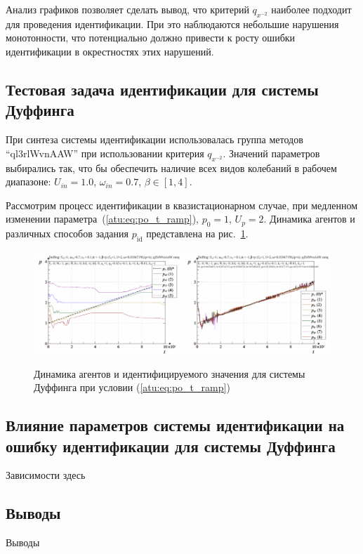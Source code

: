 Анализ графиков позволяет сделать вывод, что критерий $q_{x^{-2}}$
наиболее подходит для проведения идентификации. При это наблюдаются
небольшие нарушения монотонности, что потенциально должно привести к
росту ошибки идентификации в окрестностях этих нарушений.




\subsection{Тестовая задача идентификации для системы Дуффинга}  %

При синтеза системы идентификации использовалась группа методов ``ql3rlWvnAAW''
при использовании критерия $q_{x^{-2}}$.
Значений параметров выбирались так, что бы обеспечить
наличие всех видов колебаний в рабочем диапазоне:
$U_{in}=1.0$, $\omega_{in}=0.7$, $ \beta \in [1, 4]$.

Рассмотрим процесс идентификации
в квазистационарном случае,
при медленном изменении параметра~(\ref{atu:eq:po_t_ramp}), $p_0=1$, $U_p=2$.
Динамика агентов и различных способов задания $p_\mathrm{id}$
представлена на рис.~\ref{atu:f:duff_id_ramp}.

\begin{figure}[ht!]
\begin{center}
  \includegraphics[width=0.49\textwidth]{p/cha/duff/duff_id-p_t_pi_ql3rlWvnAAW_ramp.png}
  \hfill
  \includegraphics[width=0.49\textwidth]{p/cha/duff/duff_id-p_t_p_ql3rlWvnAAW_ramp.png}
\end{center}
  \caption{Динамика агентов и идентифицируемого значения для системы Дуффинга при условии (\ref{atu:eq:po_t_ramp})}
\label{atu:f:duff_id_ramp}
\end{figure}


\subsection{Влияние параметров системы идентификации на ошибку идентификации для системы Дуффинга}  %


Зависимости здесь


\subsection{Выводы}  %

Выводы



